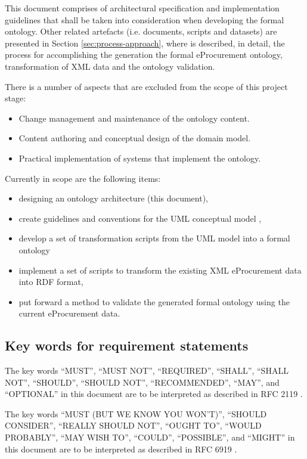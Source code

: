 	This document comprises of architectural specification and implementation guidelines that shall be taken into consideration when developing the formal ontology. Other related artefacts (i.e. documents, scripts and datasets) are presented in Section \ref{sec:process-approach}, where is described, in detail, the process for accomplishing the generation the formal eProcurement ontology, transformation of XML data and the ontology validation.
	
	There is a number of aspects that are excluded from the scope of this project stage:	
	\begin{itemize}
		\item Change management and maintenance of the ontology content.
		\item Content authoring and conceptual design of the domain model.
		\item Practical implementation of systems that implement the ontology.
	\end{itemize}
	
	Currently in scope are the following items:
	\begin{itemize}
		\item designing an ontology architecture (this document),
		\item create guidelines and conventions for the UML conceptual model \citep{costetchi2020b}, 
		\item develop a set of transformation scripts from the UML model into a formal ontology
		\item implement a set of scripts to transform the existing XML eProcurement data into RDF format,
		\item put forward a method to validate the generated formal ontology using the current eProcurement data.
	\end{itemize}

	\subsection{Key words for requirement statements}
	\label{sec:keywords}
	The key words ``MUST'', ``MUST NOT'', ``REQUIRED'', ``SHALL'', ``SHALL  NOT'', ``SHOULD'', ``SHOULD NOT'', ``RECOMMENDED'',  ``MAY'', and ``OPTIONAL'' in this document are to be interpreted as described in RFC 2119 \cite{rfc2119}.

	The key words ``MUST (BUT WE KNOW YOU WON'T)'', ``SHOULD CONSIDER'', ``REALLY SHOULD NOT'', ``OUGHT TO'', ``WOULD PROBABLY'', ``MAY WISH TO'', ``COULD'', ``POSSIBLE'', and ``MIGHT'' in this document are to be interpreted as described in RFC 6919 \cite{rfc6919}.
	

